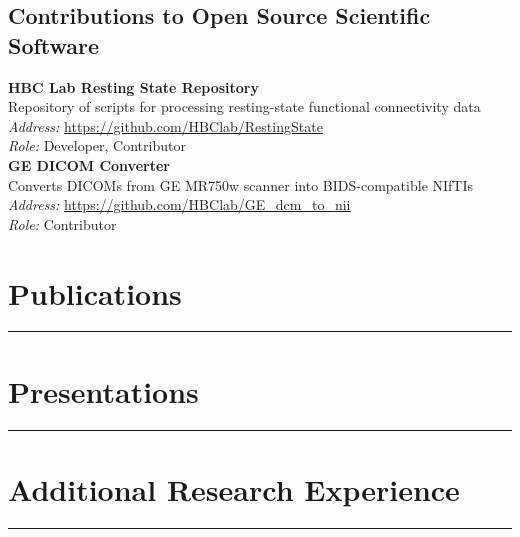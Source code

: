 \documentclass[11pt,letterpaper,sans]{moderncv}
\begin{document}
\subsection{Contributions to Open Source Scientific Software}
\textbf{HBC Lab Resting State Repository} \\
Repository of scripts for processing resting-state functional connectivity data\\
\emph{Address:} \href{https://github.com/HBClab/RestingState}{https://github.com/HBClab/RestingState}\\
\emph{Role:} Developer, Contributor\\

\textbf{GE DICOM Converter} \\
Converts DICOMs from GE MR750w scanner into BIDS-compatible NIfTIs\\
\emph{Address:} \href{https://github.com/HBClab/GE_dcm_to_nii}{https://github.com/HBClab/GE\_dcm\_to\_nii}\\
\emph{Role:} Contributor

\clearpage


\bigskip{}
\section{Publications} \smallskip \hrule \medskip
{}


\bigskip{}
\section{Presentations} \smallskip \hrule \medskip
{}


\bigskip{}
\section{Additional Research Experience} \smallskip \hrule \medskip
\end{document}
